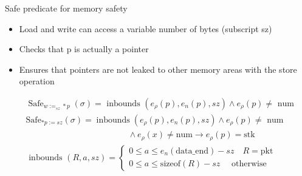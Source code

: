 \documentclass[aspectratio=169]{beamer}
\begin{document}
\begin{frame}{Safe predicate for memory safety}
  \begin{itemize}
    \item Load and write can access a variable number of bytes (subscript sz)
    \item Checks that p is actually a pointer
    \item Ensures that pointers are not leaked to other memory areas with the store operation
  \end{itemize}

  $$
    \begin{aligned}   &
                 \operatorname{Safe}_{w:=_{s z} * p}(\sigma)=\text { inbounds }\left(e_\rho(p), e_n(p), s z\right) \wedge e_\rho(p) \neq \text { num }                                                                                   \\ &
                 \mathrm{Safe}_{* p:=s z}(\sigma)=\operatorname{inbounds}\left(e_\rho(p), e_n(p), s z\right) \wedge e_\rho(p) \neq \text { num }                                                                                         \\ &
                 \qquad \qquad \qquad \qquad \qquad \qquad \wedge e_\rho(x) \neq \mathrm{num} \rightarrow e_\rho(p)=\mathrm{stk}                                                                                                         \\ &
                 \text { inbounds }(R, a, s z)= \left\{\begin{array}{l}0 \leq a \leq e_{n} (\text{data\_end})-sz \quad R=\mathrm{pkt} \\ 0 \leq a \leq \text {sizeof}(R)-sz \quad \text { otherwise }\end{array}\right. \\ &
    \end{aligned}
  $$
\end{frame}
\end{document}
